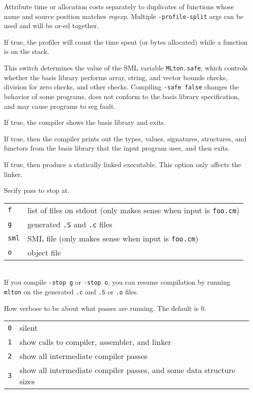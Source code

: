 \begin{description}
Attribute time or allocation costs separately to duplicates of
functions whose name and source position matches {\it regexp}.
Multiple {\tt -profile-split} args can be used and will be or-ed
together.

If true, the profiler will count the time spent (or bytes allocated)
while a function is on the stack.

This switch determines the value of the SML variable {\tt MLton.safe}, which
controls whether the basis library performs array, string, and vector bounds
checks, division for zero checks, and other checks.  Compiling {\tt -safe false}
changes the behavior of some programs, does not conform to the basis library
specification, and may cause programs to seg fault.

If true, the compiler shows the basis library and exits.

If true, then the compiler prints out the types, values, signatures, structures,
and functors from the basis library that the input program uses, and then exits.

If true, then produce a statically linked executable.  This option only
affects the linker.

Secify pass to stop at.\\
\begin{tabular}{ll}
{\tt f} & list of files on stdout (only makes sense when input is {\tt foo.cm})\\
{\tt g} & generated {\tt .S} and {\tt .c} files\\
{\tt sml} & SML file (only makes sense when input is {\tt foo.cm})\\
{\tt o} & object file\\
\end{tabular}\\
If you compile {\tt -stop g} or {\tt -stop o}, you can resume compilation by
running {\tt mlton} on the generated {\tt .c} and {\tt .S} or {\tt .o} files.

How verbose to be about what passes are running.  The default is 0.\\
\begin{tabular}{ll}
{\tt 0} & silent\\
{\tt 1} & show calls to compiler, assembler, and linker\\
{\tt 2} & show all intermediate compiler passes\\
{\tt 3} & show all intermediate compiler passes, and some data structure sizes\\
\end{tabular}\\

\end{description}

